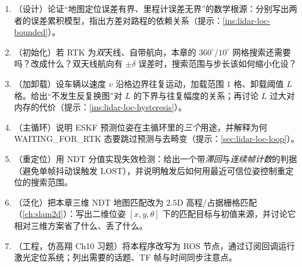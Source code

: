 \begin{practice}[本章习题]
\begin{enumerate}
  \item （设计）论证“地图定位误差有界、里程计误差无界”的数学根源：分别写出两者的误差累积模型，指出方差对路程的依赖关系（提示：\cref{ins:lidar-loc-bounded}）。
  \item （初始化）若 RTK 为\emph{双}天线、自带航向，本章的 $360^\circ/10^\circ$ 网格搜索还需要吗？改成什么？双天线航向有 $\pm\delta$ 误差时，搜索范围与步长该如何缩小化设？
  \item （加卸载）设车辆以速度 $v$ 沿格边界往复运动，加载范围 $1$ 格、卸载阈值 $L$ 格。给出“不发生反复换图”对 $L$ 的下界与往复幅度的关系；再讨论 $L$ 过大对内存的代价（提示：\cref{ins:lidar-loc-hysteresis}）。
  \item （主循环）说明 ESKF 预测位姿在主循环里的\emph{三个}用途，并解释为何 \textsf{WAITING\_FOR\_RTK} 态要跳过预测与去畸变（提示：\cref{sec:lidar-loc-loop}）。
  \item （重定位）用 NDT 分值实现失效检测：给出一个带\emph{滞回}与\emph{连续帧计数}的判据（避免单帧抖动误触发 \textsf{LOST}），并说明触发后如何用最近可信位姿控制重定位的搜索范围。
  \item （泛化）把本章三维 NDT 地图匹配改为 $2.5$D 高程/占据栅格匹配（\cref{ch:slam2d}）：写出二维位姿 $[x,y,\theta]$ 下的匹配目标与初值来源，并讨论它相对三维方案省了什么、丢了什么。
  \item （工程，仿高翔 Ch10 习题）将本程序改写为 ROS 节点，通过订阅回调运行激光定位系统；列出需要的话题、TF 帧与时间同步注意点。
\end{enumerate}
\end{practice}
